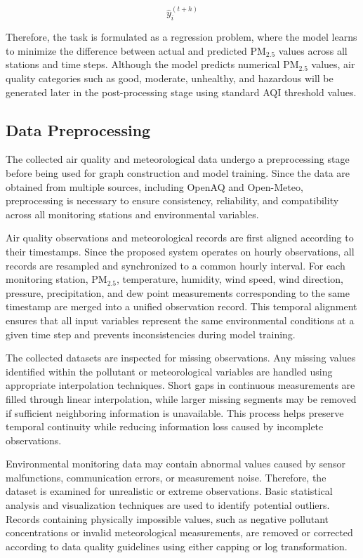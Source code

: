 \begin{equation}
\hat{y}_i^{(t+h)}
\end{equation}

Therefore, the task is formulated as a regression problem, where the model learns to minimize the difference between actual and predicted PM$_{2.5}$ values across all stations and time steps. Although the model predicts numerical PM$_{2.5}$ values, air quality categories such as good, moderate, unhealthy, and hazardous will be generated later in the post-processing stage using standard AQI threshold values.

\subsection{Data Preprocessing}

The collected air quality and meteorological data undergo a preprocessing stage before being used for graph construction and model training. Since the data are obtained from multiple sources, including OpenAQ and Open-Meteo, preprocessing is necessary to ensure consistency, reliability, and compatibility across all monitoring stations and environmental variables.

Air quality observations and meteorological records are first aligned according to their timestamps. Since the proposed system operates on hourly observations, all records are resampled and synchronized to a common hourly interval. For each monitoring station, PM$_{2.5}$, temperature, humidity, wind speed, wind direction, pressure, precipitation, and dew point measurements corresponding to the same timestamp are merged into a unified observation record. This temporal alignment ensures that all input variables represent the same environmental conditions at a given time step and prevents inconsistencies during model training.

The collected datasets are inspected for missing observations. Any missing values identified within the pollutant or meteorological variables are handled using appropriate interpolation techniques. Short gaps in continuous measurements are filled through linear interpolation, while larger missing segments may be removed if sufficient neighboring information is unavailable. This process helps preserve temporal continuity while reducing information loss caused by incomplete observations.

Environmental monitoring data may contain abnormal values caused by sensor malfunctions, communication errors, or measurement noise. Therefore, the dataset is examined for unrealistic or extreme observations. Basic statistical analysis and visualization techniques are used to identify potential outliers. Records containing physically impossible values, such as negative pollutant concentrations or invalid meteorological measurements, are removed or corrected according to data quality guidelines using either capping or log transformation.

